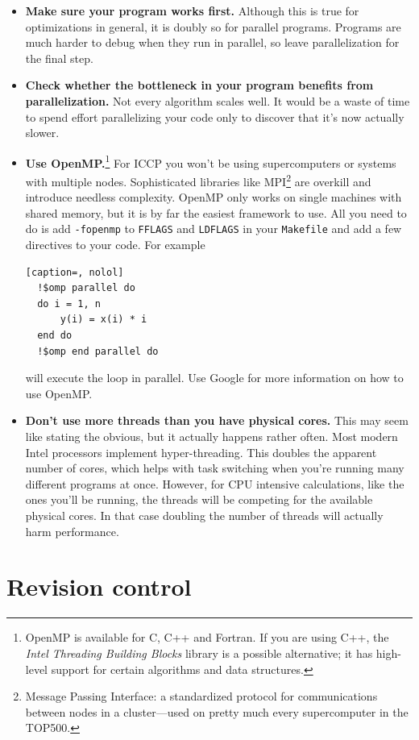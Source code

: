 \documentclass[openany,oneside]{report}
\begin{document}
\begin{itemize}
  \item\textbf{Make sure your program works first.} Although this is true for optimizations in general, it is doubly so for parallel programs.
    Programs are much harder to debug when they run in parallel, so leave parallelization for the final step.
  \item\textbf{Check whether the bottleneck in your program benefits from parallelization.} Not every algorithm scales well.
    It would be a waste of time to spend effort parallelizing your code only to discover that it's now actually slower.
  \item\textbf{Use OpenMP.}\footnote{OpenMP is available for C, C++ and Fortran.
    If you are using C++, the \emph{Intel Threading Building Blocks} library is a possible alternative; it has high-level support for certain algorithms and data structures.} For ICCP you won't be using supercomputers or systems with multiple nodes.
    Sophisticated libraries like MPI\footnote{Message Passing Interface: a standardized protocol for communications between nodes in a cluster---used on pretty much every supercomputer in the TOP500.} are overkill and introduce needless complexity.
    OpenMP only works on single machines with shared memory, but it is by far the easiest framework to use.
    All you need to do is add \texttt{-fopenmp} to \texttt{FFLAGS} and \texttt{LDFLAGS} in your \texttt{Makefile} and add a few directives to your code.
    For example
\begin{lstlisting}[caption=, nolol]
  !$omp parallel do
  do i = 1, n
      y(i) = x(i) * i
  end do
  !$omp end parallel do
\end{lstlisting}
    will execute the loop in parallel. Use Google for more information on how to use OpenMP.
  \item\textbf{Don't use more threads than you have physical cores.} This may seem like stating the obvious, but it actually happens rather often.
  Most modern Intel processors implement hyper-threading.
  This doubles the apparent number of cores, which helps with task switching when you're running many different programs at once.
  However, for CPU intensive calculations, like the ones you'll be running, the threads will be competing for the available physical cores.
  In that case doubling the number of threads will actually harm performance.
\end{itemize}

\chapter{Revision control}
\label{chap:Revision control}
\end{document}
